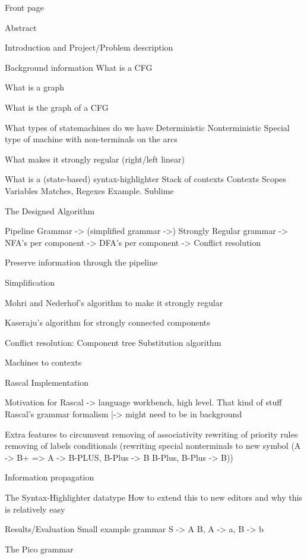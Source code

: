 
Front page

Abstract

Introduction and Project/Problem description

Background information
	What is a CFG
	
	What is a graph
	
	What is the graph of a CFG
	
	What types of statemachines do we have
		Deterministic
		Nonterministic
		Special type of machine with non-terminals on the arcs
	
	What makes it strongly regular (right/left linear)
	
	What is a (state-based) syntax-highlighter
		Stack of contexts
		Contexts
		Scopes
		Variables
		Matches, Regexes
		Example. Sublime


The Designed Algorithm

	Pipeline
		Grammar -> (simplified grammar ->) Strongly Regular grammar -> NFA's per component -> DFA's per component -> Conflict resolution 
		
		Preserve information through the pipeline
		
	Simplification
	
	Mohri and Nederhof's algorithm to make it strongly regular
	
	Kaseraju's algorithm for strongly connected components
	
	Conflict resolution:
		Component tree
		Substitution algorithm
		
	Machines to contexts
		

Rascal Implementation

	Motivation for Rascal -> language workbench, high level. That kind of stuff
	Rascal's grammar formalism
		|-> might need to be in background
	
	Extra features to circumvent
		removing of associativity
		rewriting of priority rules
		removing of labels
		conditionals
		(rewriting special nonterminals to new symbol (A -> B+ => A -> B-PLUS, B-Plus -> B B-Plus, B-Plus -> B))	
	
	Information propagation
	
	The Syntax-Highlighter datatype
		How to extend this to new editors and why this is relatively easy
	
Results/Evaluation
	Small example grammar S -> A B, A -> a, B -> b

	The Pico grammar
	
